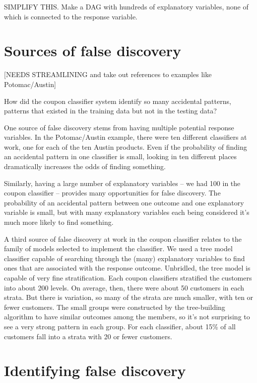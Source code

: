\documentclass[
  letterpaper,
  DIV=11,
  numbers=noendperiod,
  oneside]{scrreprt}
\begin{document}
SIMPLIFY THIS. Make a DAG with hundreds of explanatory variables, none
of which is connected to the response variable.

\hypertarget{sources-of-false-discovery}{%
\section{Sources of false discovery}\label{sources-of-false-discovery}}

{[}NEEDS STREAMLINING and take out references to examples like
Potomac/Austin{]}

How did the coupon classifier system identify so many accidental
patterns, patterns that existed in the training data but not in the
testing data?

One source of false discovery stems from having multiple potential
response variables. In the Potomac/Austin example, there were ten
different classifiers at work, one for each of the ten Austin products.
Even if the probability of finding an accidental pattern in one
classifier is small, looking in ten different places dramatically
increases the odds of finding something.

Similarly, having a large number of explanatory variables -- we had 100
in the coupon classifier -- provides many opportunities for false
discovery. The probability of an accidental pattern between one outcome
and one explanatory variable is small, but with many explanatory
variables each being considered it's much more likely to find something.

A third source of false discovery at work in the coupon classifier
relates to the family of models selected to implement the classifier. We
used a tree model classifier capable of searching through the (many)
explanatory variables to find ones that are associated with the response
outcome. Unbridled, the tree model is capable of very fine
stratification. Each coupon classifiers stratified the customers into
about 200 levels. On average, then, there were about 50 customers in
each strata. But there is variation, so many of the strata are much
smaller, with ten or fewer customers. The small groups were constructed
by the tree-building algorithm to have similar outcomes among the
members, so it's not surprising to see a very strong pattern in each
group. For each classifier, about 15\% of all customers fall into a
strata with 20 or fewer customers.

\hypertarget{identifying-false-discovery}{%
\section{Identifying false
discovery}\label{identifying-false-discovery}}
\end{document}
